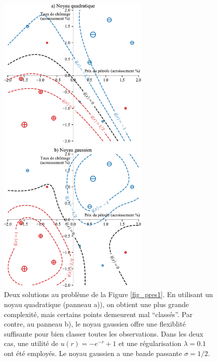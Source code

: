 \begin{figure}[p]
  \centering
  \includegraphics[width=0.65\textwidth]{../experiments/fig/pres/pres10_fr.pdf}
  \caption[Solutions quadratique et gaussienne]{Deux solutions au problème de la Figure
    \ref{fig_pres1}. En utilisant un noyau quadratique (panneau a)), on obtient une plus
    grande complexité, mais certains points demeurent mal ``classés''. Par contre, au
    panneau b), le noyau gaussien offre une flexiblité suffisante pour bien classer toutes
    les observations. Dans les deux cas, une utilité de $u(r) = -e^{-r}+1$ et une
    régularisation $\lambda=0.1$ ont été employés. Le noyau gaussien a une bande passante
    $\sigma = 1/2$. }
  \label{fig_yeah}
\end{figure}









